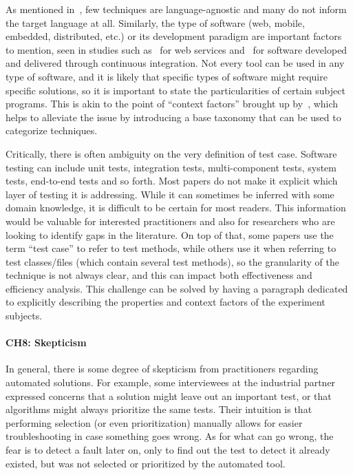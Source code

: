 As mentioned in~, few \rt techniques are language-agnostic and many do not inform the target language at all.
Similarly, the type of software (web, mobile, embedded, distributed, etc.) or its development paradigm are important factors to mention, seen in studies such as~ for web services and~ for software developed and delivered through continuous integration.
Not every tool can be used in any type of software, and it is likely that specific types of software might require specific solutions, so it is important to state the particularities of certain subject programs.
This is akin to the point of ``context factors'' brought up by~\citet{bin_ali_search_2019}, which helps to alleviate the issue by introducing a base taxonomy that can be used to categorize techniques.

Critically, there is often ambiguity on the very definition of test case.
Software testing can include unit tests, integration tests, multi-component tests, system tests, end-to-end tests and so forth.
Most papers do not make it explicit which layer of testing it is addressing. While it can sometimes be inferred with some domain knowledge, it is difficult to be certain for most readers.
This information would be valuable for interested practitioners and also for researchers who are looking to identify gaps in the literature.
On top of that, some papers use the term ``test case'' to refer to test methods, while others use it when referring to test classes/files (which contain several test methods), so the granularity of the technique is not always clear, and this can impact both effectiveness and efficiency analysis.
This challenge can be solved by having a paragraph dedicated to explicitly describing the properties and context factors of the experiment subjects.

\paragraph{CH8: Skepticism}
In general, there is some degree of skepticism from practitioners regarding automated solutions.
For example, some interviewees at the industrial partner expressed concerns that a \tcs solution might leave out an important test, or that \tcp algorithms might always prioritize the same tests.
Their intuition is that performing selection (or even prioritization) manually allows for easier troubleshooting in case something goes wrong.
As for what can go wrong, the fear is to detect a fault later on, only to find out the test to detect it already existed, but was not selected or prioritized by the automated tool.

